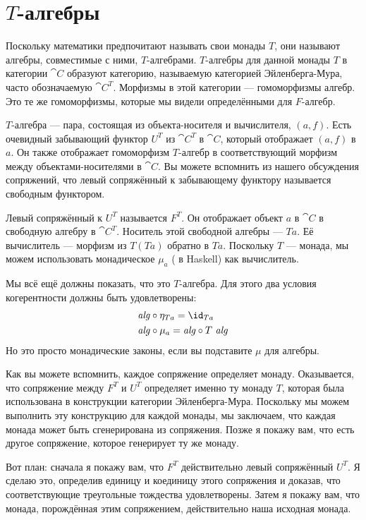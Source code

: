 \section{$T$-алгебры}

Поскольку математики предпочитают называть свои монады $T$, они называют
алгебры, совместимые с ними, $T$-алгебрами. $T$-алгебры для данной монады $T$
в категории $\cat{C}$ образуют категорию, называемую категорией Эйленберга-Мура,
часто обозначаемую $\cat{C}^T$. Морфизмы в этой
категории --- гомоморфизмы алгебр. Это те же гомоморфизмы,
которые мы видели определёнными для $F$-алгебр.

$T$-алгебра --- пара, состоящая из объекта-носителя и вычислителя,
$(a, f)$. Есть очевидный забывающий функтор $U^T$ из
$\cat{C}^T$ в $\cat{C}$, который отображает $(a, f)$ в $a$. Он
также отображает гомоморфизм $T$-алгебр в соответствующий морфизм
между объектами-носителями в $\cat{C}$. Вы можете вспомнить из нашего обсуждения
сопряжений, что левый сопряжённый к забывающему функтору называется
свободным функтором.

Левый сопряжённый к $U^T$ называется $F^T$. Он отображает объект
$a$ в $\cat{C}$ в свободную алгебру в $\cat{C}^T$. Носитель
этой свободной алгебры --- $T a$. Её вычислитель --- морфизм из
$T (T a)$ обратно в $T a$. Поскольку $T$ --- монада,
мы можем использовать монадическое $\mu_a$ ( в Haskell) как
вычислитель.

Мы всё ещё должны показать, что это $T$-алгебра. Для этого два условия
когерентности должны быть удовлетворены:
\begin{align*}
  \mathit{alg} & \circ \eta_{Ta} = \id_{Ta}     \\
  \mathit{alg} & \circ \mu_a = \mathit{alg} \circ T\ \mathit{alg}
\end{align*}
Но это просто монадические законы, если вы подставите $\mu$ для
алгебры.

Как вы можете вспомнить, каждое сопряжение определяет монаду. Оказывается, что
сопряжение между $F^T$ и $U^T$
определяет именно ту монаду $T$, которая была использована в конструкции
категории Эйленберга-Мура. Поскольку мы можем выполнить эту конструкцию для
каждой монады, мы заключаем, что каждая монада может быть сгенерирована из
сопряжения. Позже я покажу вам, что есть другое сопряжение, которое
генерирует ту же монаду.

Вот план: сначала я покажу вам, что $F^T$ действительно левый
сопряжённый $U^T$. Я сделаю это, определив единицу и коединицу
этого сопряжения и доказав, что соответствующие треугольные
тождества удовлетворены. Затем я покажу вам, что монада, порождённая
этим сопряжением, действительно наша исходная монада.

